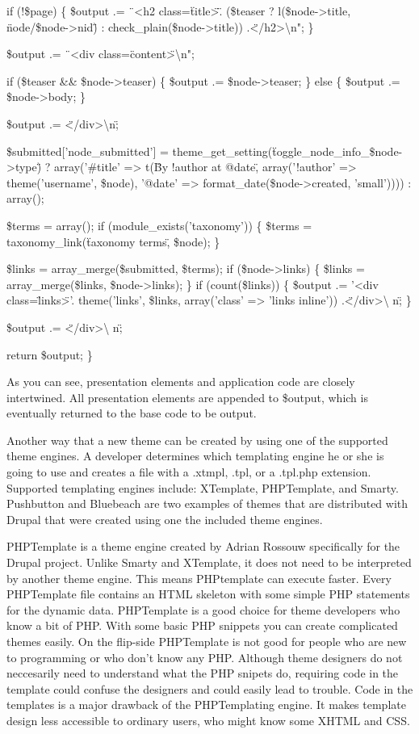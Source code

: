 \documentclass[a4paper,12pt]{report}
\begin{document}
  if (!\$page) \{
    \$output .= \"\ <h2 class=\"title\">\". (\$teaser ? l(\$node->title, \"node/\$node->nid\") : check\_plain(\$node->title)) .\"</h2>\textbackslash n";
  \}

  \$output .= \"\ <div class=\"content\">\textbackslash n";

  if (\$teaser \&\& \$node->teaser) \{
    \$output .= \$node->teaser;
  \}
  else \{
    \$output .= \$node->body;
  \}

  \$output .= \" </div>\textbackslash n\";

  \$submitted['node\_submitted'] = theme\_get\_setting(\"toggle\_node\_info\_\$node->type\") ? array('\#title' => t(\"By !author at @date\", array('!author' => theme('username', \$node), '@date' => format\_date(\$node->created, 'small')))) : array();

  \$terms = array();
  if (module\_exists('taxonomy')) \{
    \$terms = taxonomy\_link(\"taxonomy terms\", \$node);
  \}

  \$links = array\_merge(\$submitted, \$terms);
  if (\$node->links) \{
    \$links = array\_merge(\$links, \$node->links);
  \}
  if (count(\$links)) \{
    \$output .= '<div class=\"links\">'. theme('links', \$links, array('class' => 'links inline')) .\"</div>\textbackslash{} n\";
  \}

  \$output .= \"</div>\textbackslash{} n\";

  return \$output;
\} 


As you can see, presentation elements and application code are closely intertwined. 
All presentation elements are appended to \$output, which is eventually returned to the base code to be output.


Another way that a new theme can be created by using one of the supported theme engines. 
A developer determines which templating engine he or she is going to use and creates a file with a .xtmpl, .tpl, or a .tpl.php extension. 
Supported templating engines include: XTemplate, PHPTemplate, and Smarty. 
Pushbutton and Bluebeach are two examples of themes that are distributed with Drupal that were created using one the included theme engines. 


PHPTemplate is a theme engine created by Adrian Rossouw specifically for the Drupal project. 
Unlike Smarty and XTemplate, it does not need to be interpreted by another theme engine. 
This means PHPtemplate can execute faster. 
Every PHPTemplate file contains an HTML skeleton with some simple PHP statements for the dynamic data. 
PHPTemplate is a good choice for theme developers who know a bit of PHP. With some basic PHP snippets you can create complicated themes easily. 
On the flip-side PHPTemplate is not good for people who are new to programming or who don't know any PHP. 
Although theme designers do not neccesarily need to understand what the PHP snipets do, requiring code in the template could confuse the designers and could easily lead to trouble. 
Code in the templates is a major drawback of the PHPTemplating engine. 
It makes template design less accessible to ordinary users, who might know some XHTML and CSS. 
\end{document}
